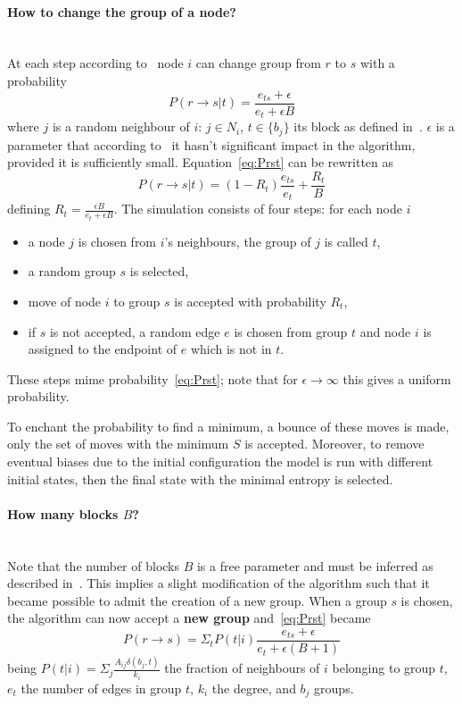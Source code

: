 \paragraph{How to change the group of a node?}\mbox{}\\
At each step according to~\cite{peixoto2014efficient} node $i$ can change group from $r$ to $s$ with a probability
\begin{equation}\label{eq:Prst}
  P(r\to s|t)=\frac{e_{ts}+\epsilon}{e_t+\epsilon B}
\end{equation}
where $j$ is a random neighbour of $i$: $j\in N_i$, $t\in\{b_j\}$ its block as defined in~\cite{peixoto2014efficient}. $\epsilon$ is a parameter that according to~\cite{peixoto2017nonparametric} it hasn't significant impact in the algorithm, provided it is sufficiently small.
Equation~\ref{eq:Prst} can be rewritten as \[P(r\to s|t)=(1-R_t)\frac{e_{ts}}{e_t}+\frac{R_t}{B}\] defining $R_t=\frac{\epsilon B}{e_t + \epsilon B}$.
The simulation consists of four steps: for each node $i$
\begin{itemize}
  \item a node $j$ is chosen from $i$'s neighbours, the group of $j$ is called
  $t$,
  \item a random group $s$ is selected,
  \item move of node $i$ to group $s$ is accepted with probability $R_t$,
  \item if $s$ is not accepted, a random edge $e$ is chosen from group $t$ and node $i$ is assigned to the endpoint of $e$ which is not in $t$.
\end{itemize}
These steps mime probability~\ref{eq:Prst}; note that for $\epsilon\to\infty$ this gives a uniform probability.

To enchant the probability to find a minimum, a bounce of these moves is made, only the set of moves with the minimum $S$ is accepted. Moreover, to remove eventual biases due to the initial configuration the model is run with different initial states, then the final state with the minimal entropy is selected.

\paragraph{How many blocks $B$?}\mbox{}\\
Note that the number of blocks $B$ is a free parameter and must be inferred as described in~\cite{peixoto2017nonparametric}. This implies a slight modification of the algorithm such that it became possible to admit the creation of  a new group.
When a group $s$ is chosen, the algorithm can now accept a \textbf{new group} and~\ref{eq:Prst} became
\begin{equation}\label{eq:PrstB1}
  P(r\to s)=\Sigma_t P(t|i)\frac{e_{ts}+\epsilon}{e_t+\epsilon (B+1)}
\end{equation}
being $P(t|i)=\Sigma_j\frac{A_{ij}\delta(b_j, t)}{k_i}$ the fraction of neighbours of $i$ belonging to group $t$, $e_t$ the number of edges in group $t$,
$k_i$ the degree, and $b_j$ groups.

